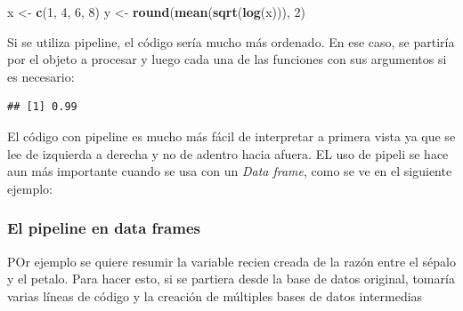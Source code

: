 \documentclass[]{book}
\newenvironment{Shaded}{\begin{snugshade}}{\end{snugshade}}
\newcommand{\DecValTok}[1]{\textcolor[rgb]{0.00,0.00,0.81}{#1}}
\newcommand{\KeywordTok}[1]{\textcolor[rgb]{0.13,0.29,0.53}{\textbf{#1}}}
\newcommand{\NormalTok}[1]{#1}
\newcommand{\OperatorTok}[1]{\textcolor[rgb]{0.81,0.36,0.00}{\textbf{#1}}}
\newcommand{\StringTok}[1]{\textcolor[rgb]{0.31,0.60,0.02}{#1}}
\begin{document}
\begin{Shaded}
\begin{Highlighting}[]
\NormalTok{x <-}\StringTok{ }\KeywordTok{c}\NormalTok{(}\DecValTok{1}\NormalTok{, }\DecValTok{4}\NormalTok{, }\DecValTok{6}\NormalTok{, }\DecValTok{8}\NormalTok{)}
\NormalTok{y <-}\StringTok{ }\KeywordTok{round}\NormalTok{(}\KeywordTok{mean}\NormalTok{(}\KeywordTok{sqrt}\NormalTok{(}\KeywordTok{log}\NormalTok{(x))), }\DecValTok{2}\NormalTok{)}
\end{Highlighting}
\end{Shaded}

Si se utiliza pipeline, el código sería mucho más ordenado. En ese caso,
se partiría por el objeto a procesar y luego cada una de las funciones
con sus argumentos si es necesario:

\begin{Shaded}
\end{Shaded}

\begin{verbatim}
## [1] 0.99
\end{verbatim}

El código con pipeline es mucho más fácil de interpretar a primera vista
ya que se lee de izquierda a derecha y no de adentro hacia afuera. EL
uso de pipeli se hace aun más importante cuando se usa con un \emph{Data
frame}, como se ve en el siguiente ejemplo:

\hypertarget{el-pipeline-en-data-frames}{%
\subsubsection{El pipeline en data
frames}\label{el-pipeline-en-data-frames}}

POr ejemplo se quiere resumir la variable recien creada de la razón
entre el sépalo y el petalo. Para hacer esto, si se partiera desde la
base de datos original, tomaría varias líneas de código y la creación de
múltiples bases de datos intermedias
\end{document}
